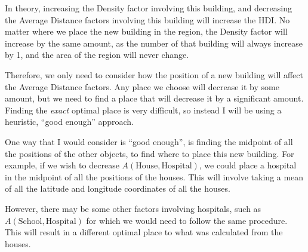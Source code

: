 \documentclass[12pt]{report}
\begin{document}
In theory, increasing the Density factor involving this building, and decreasing the Average Distance factors involving this building will increase the HDI. No matter where we place the new building in the region, the Density factor will increase by the same amount, as the number of that building will always increase by 1, and the area of the region will never change.

Therefore, we only need to consider how the position of a new building will affect the Average Distance factors. Any place we choose will decrease it by some amount, but we need to find a place that will decrease it by a significant amount. Finding the \textit{exact} optimal place is very difficult, so instead I will be using a heuristic, ``good enough'' approach.

One way that I would consider is ``good enough'', is finding the midpoint of all the positions of the other objects, to find where to place this new building. For example, if we wish to decrease $A\left(\text{House},\text{Hospital}\right)$, we could place a hospital in the midpoint of all the positions of the houses. This will involve taking a mean of all the latitude and longitude coordinates of all the houses.

However, there may be some other factors involving hospitals, such as $A\left(\text{School},\text{Hospital}\right)$ for which we would need to follow the same procedure. This will result in a different optimal place to what was calculated from the houses.
\end{document}
